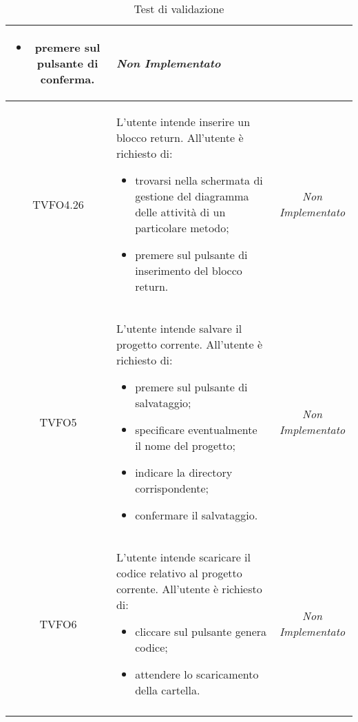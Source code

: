 \begin{longtable}{|c|>{}m{8cm}|c|}
\begin{itemize}
	\item premere sul pulsante di conferma.
\end{itemize} & \textit{Non Implementato}\\ \hline
\hypertarget{TVFO4.26}{TVFO4.26} & L'utente intende inserire un blocco return.
All'utente è richiesto di:
\begin{itemize}
	\item trovarsi nella schermata di gestione del diagramma delle attività di un particolare metodo;
	\item premere sul pulsante di inserimento del blocco return.
\end{itemize} & \textit{Non Implementato}\\ \hline
\hypertarget{TVFO5}{TVFO5} & L'utente intende salvare il progetto corrente.
All'utente è richiesto di:
\begin{itemize}
	\item premere sul pulsante di salvataggio;
	\item specificare eventualmente il nome del progetto;
	\item indicare la directory corrispondente;
	\item confermare il salvataggio.
\end{itemize} & \textit{Non Implementato}\\ \hline
\hypertarget{TVFO6}{TVFO6} & L'utente intende scaricare il codice relativo al progetto corrente.
All'utente è richiesto di:
\begin{itemize}
	\item cliccare sul pulsante genera codice;
	\item attendere lo scaricamento della cartella.
\end{itemize} & \textit{Non Implementato}\\ \hline
\caption[Test di validazione]{Test di validazione}
\label{tab:valid}
\end{longtable}
\clearpage

